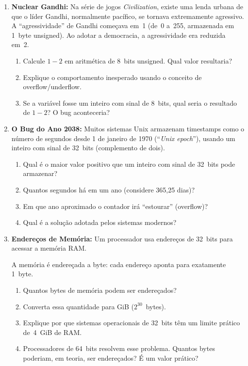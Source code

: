 \documentclass[11pt, a4paper]{article}
\begin{document}
\begin{enumerate}
\newpage
\item \textbf{Nuclear Gandhi:} Na s\'{e}rie de jogos \emph{Civilization}, existe uma lenda urbana de que o l\'{i}der Gandhi, normalmente pac\'{i}fico, se tornava extremamente agressivo. A ``agressividade'' de Gandhi come\c{c}ava em~1 (de~0 a~255, armazenada em 1~byte unsigned). Ao adotar a democracia, a agressividade era reduzida em~2.
\begin{enumerate}
  \item Calcule $1 - 2$ em aritm\'{e}tica de 8~bits unsigned. Qual valor resultaria?
  \item Explique o comportamento inesperado usando o conceito de overflow/underflow.
  \item Se a vari\'{a}vel fosse um inteiro com sinal de 8~bits, qual seria o resultado de $1-2$? O bug aconteceria?
\end{enumerate}
\item \textbf{O Bug do Ano 2038:} Muitos sistemas Unix armazenam timestamps como o n\'{u}mero de segundos desde 1\textordmasculine{} de janeiro de 1970 (``\emph{Unix epoch}''), usando um inteiro com sinal de 32~bits (complemento de dois).
\begin{enumerate}
  \item Qual \'{e} o maior valor positivo que um inteiro com sinal de 32~bits pode armazenar?
  \item Quantos segundos h\'{a} em um ano (considere 365,25 dias)?
  \item Em que ano aproximado o contador ir\'{a} ``estourar'' (overflow)?
  \item Qual \'{e} a solu\c{c}\~{a}o adotada pelos sistemas modernos?
\end{enumerate}

\item \textbf{Endere\c{c}os de Mem\'{o}ria:} Um processador usa endere\c{c}os de 32~bits para acessar a mem\'{o}ria RAM.
\begin{dica}
A mem\'{o}ria \'{e} endere\c{c}ada a byte: cada endere\c{c}o aponta para exatamente 1~byte.
\end{dica}
\vspace{-2pt}
\begin{enumerate}
  \item Quantos bytes de mem\'{o}ria podem ser endere\c{c}ados?
  \item Converta essa quantidade para GiB ($2^{30}$~bytes).
  \item Explique por que sistemas operacionais de 32~bits t\^{e}m um limite pr\'{a}tico de~4~GiB de RAM.
  \item Processadores de 64~bits resolvem esse problema. Quantos bytes poderiam, em teoria, ser endere\c{c}ados? \'{E} um valor pr\'{a}tico?
\end{enumerate}


\end{enumerate}
\end{document}
